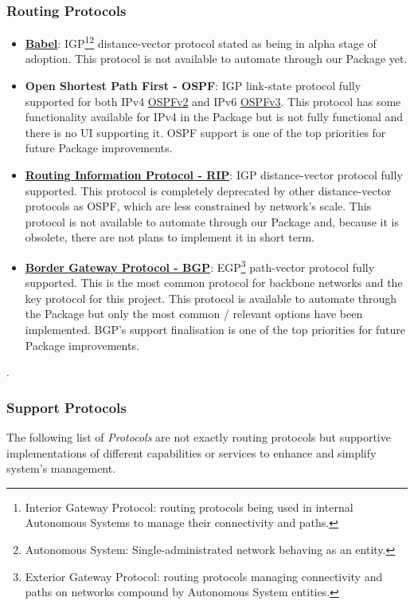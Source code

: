 \subsubsection{Routing Protocols}
\begin{itemize}
    \item \textbf{\href{https://www.irif.fr/~jch//software/babel/}{Babel}}: IGP\footnote{Interior Gateway Protocol: routing protocols being used in internal Autonomous Systems to manage their connectivity and paths.}\footnote{Autonomous System: Single-administrated network behaving as an entity.} distance-vector protocol stated as being in alpha stage of adoption.
    This protocol is not available to automate through our Package yet.
    \item \textbf{Open Shortest Path First - OSPF}: IGP link-state protocol fully supported for both IPv4 \href{https://tools.ietf.org/html/rfc2328}{OSPFv2} and IPv6 \href{https://tools.ietf.org/html/rfc5340}{OSPFv3}.
    This protocol has some functionality available for IPv4 in the Package but is not fully functional and there is no UI supporting it. OSPF support is one of the top priorities for future Package improvements.
    \item \textbf{\href{https://www.rfc-editor.org/rfc/rfc2453.txt}{Routing Information Protocol - RIP}}: IGP distance-vector protocol fully supported. This protocol is completely deprecated by other distance-vector protocols as OSPF, which are less constrained by network's scale.
    This protocol is not available to automate through our Package and, because it is obsolete, there are not plans to implement it in short term.
    \item \textbf{\href{https://www.rfc-editor.org/rfc/rfc4271.txt}{Border Gateway Protocol - BGP}}: EGP\footnote{Exterior Gateway Protocol: routing protocols managing connectivity and paths on networks compound by Autonomous System entities.} path-vector protocol fully supported. This is the most common protocol for backbone networks and the key protocol for this project.
    This protocol is available to automate through the Package but only the most common / relevant options have been implemented. BGP's support finalisation is one of the top priorities for future Package improvements. 
\end{itemize}.

\subsubsection{Support Protocols}
The following list of \textit{Protocols} are not exactly routing protocols but supportive implementations of different capabilities or services to enhance and simplify system's management.

